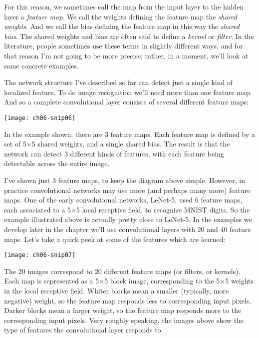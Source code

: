 For this reason, we sometimes call the map from the input layer to the hidden layer a \textit{feature map}. We call the weights defining the feature map the \textit{shared weights}. And we call the bias defining the feature map in this way the \textit{shared bias}. The shared weights and bias are often said to define a \textit{kernel} or \textit{filter}. In the literature, people sometimes use these terms in slightly different ways, and for that reason I'm not going to be more precise; rather, in a moment, we'll look at some concrete examples.

The network structure I've described so far can detect just a single kind of localized feature. To do image recognition we'll need more than one feature map. And so a complete convolutional layer consists of several different feature maps:

\begin{figure*}[tph]
    \texttt{[image: ch06-snip06]}
    \end{figure*}

In the example shown, there are 3 feature maps. Each feature map is defined by a set of 5$\times$5 shared weights, and a single shared bias. The result is that the network can detect 3 different kinds of features, with each feature being detectable across the entire image.

I've shown just 3 feature maps, to keep the diagram above simple. However, in practice convolutional networks may use more (and perhaps many more) feature maps. One of the early convolutional networks, LeNet-5, used 6 feature maps, each associated to a 5$\times$5 local receptive field, to recognize MNIST digits. So the example illustrated above is actually pretty close to LeNet-5. In the examples we develop later in the chapter we'll use convolutional layers with 20 and 40 feature maps. Let's take a quick peek at some of the features which are learned:

\begin{figure*}[tph]
    \texttt{[image: ch06-snip07]}
    \end{figure*}

The 20 images correspond to 20 different feature maps (or filters, or kernels). Each map is represented as a 5$\times$5 block image, corresponding to the 5$\times$5 weights in the local receptive field. Whiter blocks mean a smaller (typically, more negative) weight, so the feature map responds less to corresponding input pixels. Darker blocks mean a larger weight, so the feature map responds more to the corresponding input pixels. Very roughly speaking, the images above show the type of features the convolutional layer responds to.

